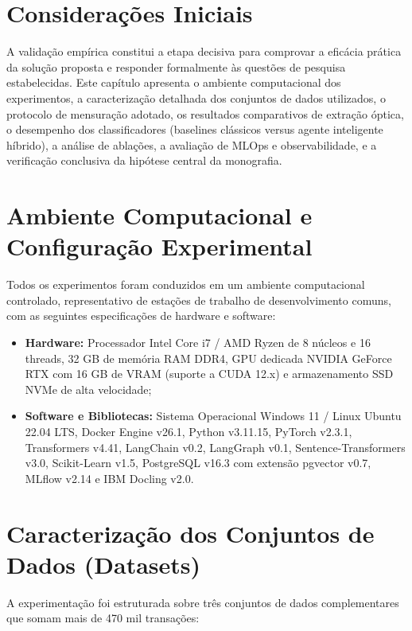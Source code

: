 \documentclass[
	12pt,				
	openright,			
	oneside,			
	a4paper,			
	english,			
	brazil				
	]{abntex2}
\begin{document}
\section{Considerações Iniciais}
\label{sec:val_consideracoes_iniciais}

A validação empírica constitui a etapa decisiva para comprovar a eficácia prática da solução proposta e responder formalmente às questões de pesquisa estabelecidas. Este capítulo apresenta o ambiente computacional dos experimentos, a caracterização detalhada dos conjuntos de dados utilizados, o protocolo de mensuração adotado, os resultados comparativos de extração óptica, o desempenho dos classificadores (baselines clássicos versus agente inteligente híbrido), a análise de ablações, a avaliação de MLOps e observabilidade, e a verificação conclusiva da hipótese central da monografia.

\section{Ambiente Computacional e Configuração Experimental}
\label{sec:val_ambiente}

Todos os experimentos foram conduzidos em um ambiente computacional controlado, representativo de estações de trabalho de desenvolvimento comuns, com as seguintes especificações de hardware e software:
\begin{itemize}
    \item \textbf{Hardware:} Processador Intel Core i7 / AMD Ryzen de 8 núcleos e 16 threads, 32 GB de memória RAM DDR4, GPU dedicada NVIDIA GeForce RTX com 16 GB de VRAM (suporte a CUDA 12.x) e armazenamento SSD NVMe de alta velocidade;
    \item \textbf{Software e Bibliotecas:} Sistema Operacional Windows 11 / Linux Ubuntu 22.04 LTS, Docker Engine v26.1, Python v3.11.15, PyTorch v2.3.1, Transformers v4.41, LangChain v0.2, LangGraph v0.1, Sentence-Transformers v3.0, Scikit-Learn v1.5, PostgreSQL v16.3 com extensão pgvector v0.7, MLflow v2.14 e IBM Docling v2.0.
\end{itemize}

\section{Caracterização dos Conjuntos de Dados (Datasets)}
\label{sec:val_datasets}

A experimentação foi estruturada sobre três conjuntos de dados complementares que somam mais de 470 mil transações:
\end{document}
